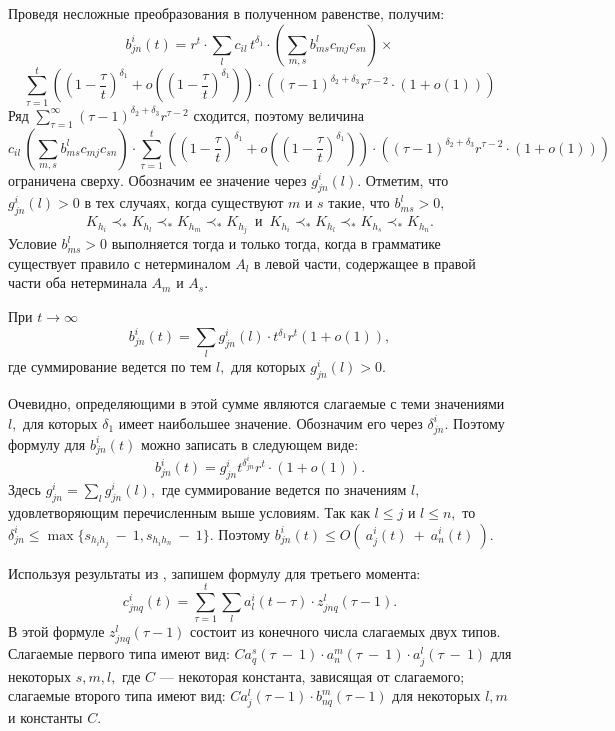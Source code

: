 \documentclass[%
11pt,a4paper]{article}
\begin{document}
{{{Проведя несложные преобразования в полученном равенстве, получим:
$$
b^i_{jn}(t)= r^t \cdot 
\sum_{l}   c_{il}\,t^{\delta_1} \cdot \left(\sum_{m,s} b^l_{ms}c_{mj} c_{sn}\right)\times
$$
$$
\sum_{\tau=1}^t\left(\left(1-\frac{\tau}{t} \right)^{\delta_1}+o \left(\left(1-\frac{\tau}{t} \right)^{\delta_1}\right)\right)
\cdot \left(\left(\tau-1\right)^{\delta_2+\delta_3}r^{\tau-2} \cdot \left( 1+o \left(1\right) \right)\right)
$$
Ряд
$\sum_{\tau=1}^{\infty} \left(\tau-1\right)^{\delta_2+\delta_3}  r^{\tau-2}$ сходится, поэтому величина 
$$
c_{il}\, \left(\sum_{m,s} b^l_{ms}c_{mj} c_{sn}\right)\cdot
\sum_{\tau=1}^t\left(\left(1-\frac{\tau}{t} \right)^{\delta_1}+o \left(\left(1-\frac{\tau}{t} \right)^{\delta_1}\right)\right)
\cdot \left(\left(\tau-1\right)^{\delta_2+\delta_3}r^{\tau-2} \cdot \left( 1+o \left(1\right) \right)\right)
$$
ограничена сверху.  Обозначим ее значение через $g^i_{jn}(l).$
Отметим, что $g^i_{jn}(l)>0$ в тех случаях, когда существуют $m$ и $s$ такие, что $b^l_{ms}>0,$
$$
K_{h_i}\prec_*K_{h_l}\prec_*K_{h_m}\prec_*K_{h_j} \, \, \, \mbox{и} \, \, \, K_{h_i}\prec_*K_{h_l}\prec_*K_{h_s}\prec_*K_{h_n}.
$$
Условие $b^l_{ms}>0$ выполняется тогда и только тогда, когда в грамматике существует правило с нетерминалом $A_l$ в левой части, содержащее в правой части оба нетерминала $A_m$ и $A_s.$

При $t\rightarrow \infty$
$$
b^i_{jn}(t)=\sum_{l} g^i_{jn}(l) \cdot t^{\delta_1} r^t (1+o(1)),
$$
где суммирование ведется по тем $l,$ для которых $g^i_{jn}(l)>0$.

Очевидно, определяющими в этой сумме являются слагаемые с теми значениями $l,$ для которых ${\delta_1}$ имеет наибольшее значение. Обозначим его через $\delta^i_{jn}.$ Поэтому формулу для $b^i_{jn}(t)$ можно записать в следующем виде:
\begin{equation}
b^i_{jn}(t)= g^i_{jn} t^{\delta^i_{jn}} r^t  \cdot (1+o(1)).
\label{50}
\end{equation}
Здесь $g^i_{jn}=\sum_{l} g^i_{jn}(l),$ где суммирование ведется по значениям $l,$ удовлетворяющим перечисленным выше условиям.
Так как $l\leq j$ и $l \le n,$ то $\delta^i_{jn} \leq \max \{s_{h_ih_j}~-~1,s_{h_ih_n}~-~1\}.$ Поэтому $b^i_{jn}(t) \le O\left(~ a^i_j(t)~+~a^i_n(t)~\right).$

Используя результаты из \cite{sev}, запишем формулу для третьего момента:
$$
c^i_{jnq}(t)=\sum_{\tau=1}^t \sum_l a^i_l(t-\tau)\cdot z^l_{jnq}(\tau-1).
$$
В этой формуле $z^l_{jnq}(\tau-1)$ состоит из конечного числа
слагаемых двух типов. Слагаемые первого типа имеют вид: $C
a^s_q(\tau~-~1) \cdot a^m_n(\tau~-~1) \cdot a^l_j(\tau~-~1) $ для некоторых
$s,m,l,$ где $C$ --- некоторая константа, зависящая от слагаемого;
слагаемые второго типа имеют вид: $C
a^l_j(\tau-1) \cdot b^m_{nq}(\tau-1)$ для некоторых $l,m$ и константы
$C.$

}}}
\end{document}
